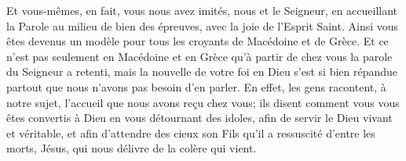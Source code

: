 Et vous-mêmes, en fait, vous nous avez imités, nous et le Seigneur,
	en accueillant la Parole au milieu de bien des épreuves,
	avec la joie de l’Esprit Saint.
Ainsi vous êtes devenus un modèle pour tous les croyants de Macédoine et de Grèce.
Et ce n’est pas seulement en Macédoine et en Grèce
		qu’à partir de chez vous la parole du Seigneur a retenti,
	mais la nouvelle de votre foi en Dieu s’est si bien répandue partout
	que nous n’avons pas besoin d’en parler.
En effet, les gens racontent, à notre sujet, l’accueil que nous avons reçu chez vous;
	ils disent comment vous vous êtes convertis à Dieu en vous détournant des idoles,
	afin de servir le Dieu vivant et véritable,
	et afin d’attendre des cieux son Fils qu’il a ressuscité d’entre les morts,
	Jésus, qui nous délivre de la colère qui vient.
